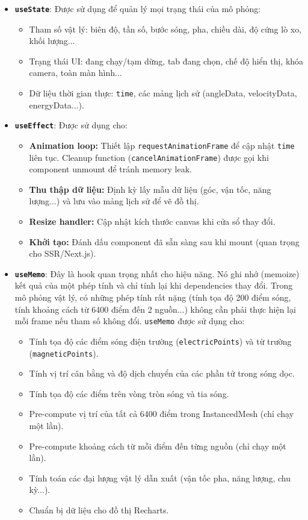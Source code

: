 \begin{itemize}
    \item \textbf{\texttt{useState}}: Được sử dụng để quản lý mọi trạng thái của mô phỏng:
    \begin{itemize}
        \item Tham số vật lý: biên độ, tần số, bước sóng, pha, chiều dài, độ cứng lò xo, khối lượng...
        \item Trạng thái UI: đang chạy/tạm dừng, tab đang chọn, chế độ hiển thị, khóa camera, toàn màn hình...
        \item Dữ liệu thời gian thực: \texttt{time}, các mảng lịch sử (angleData, velocityData, energyData...).
    \end{itemize}
    
    \item \textbf{\texttt{useEffect}}: Được sử dụng cho:
    \begin{itemize}
        \item \textbf{Animation loop:} Thiết lập \texttt{requestAnimationFrame} để cập nhật \texttt{time} liên tục. Cleanup function (\texttt{cancelAnimationFrame}) được gọi khi component unmount để tránh memory leak.
        \item \textbf{Thu thập dữ liệu:} Định kỳ lấy mẫu dữ liệu (góc, vận tốc, năng lượng...) và lưu vào mảng lịch sử để vẽ đồ thị.
        \item \textbf{Resize handler:} Cập nhật kích thước canvas khi cửa sổ thay đổi.
        \item \textbf{Khởi tạo:} Đánh dấu component đã sẵn sàng sau khi mount (quan trọng cho SSR/Next.js).
    \end{itemize}
    
    \item \textbf{\texttt{useMemo}}: Đây là hook quan trọng nhất cho hiệu năng. Nó ghi nhớ (memoize) kết quả của một phép tính và chỉ tính lại khi dependencies thay đổi. Trong mô phỏng vật lý, có những phép tính rất nặng (tính tọa độ 200 điểm sóng, tính khoảng cách từ 6400 điểm đến 2 nguồn...) không cần phải thực hiện lại mỗi frame nếu tham số không đổi. \texttt{useMemo} được sử dụng cho:
    \begin{itemize}
        \item Tính tọa độ các điểm sóng điện trường (\texttt{electricPoints}) và từ trường (\texttt{magneticPoints}).
        \item Tính vị trí cân bằng và độ dịch chuyển của các phần tử trong sóng dọc.
        \item Tính tọa độ các điểm trên vòng tròn sóng và tia sóng.
        \item Pre-compute vị trí của tất cả 6400 điểm trong InstancedMesh (chỉ chạy một lần).
        \item Pre-compute khoảng cách từ mỗi điểm đến từng nguồn (chỉ chạy một lần).
        \item Tính toán các đại lượng vật lý dẫn xuất (vận tốc pha, năng lượng, chu kỳ...).
        \item Chuẩn bị dữ liệu cho đồ thị Recharts.
    \end{itemize}
    

\end{itemize}
